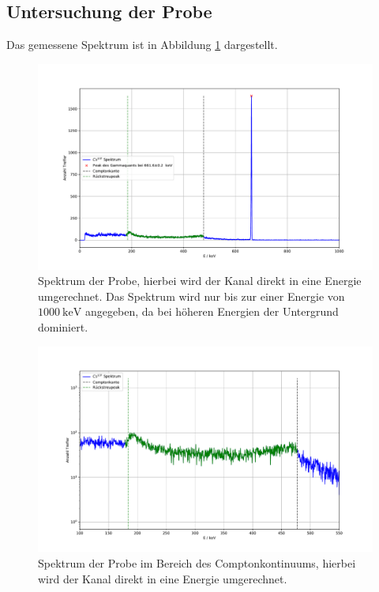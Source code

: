 \subsection{Untersuchung der  Probe}
Das gemessene Spektrum ist in Abbildung \ref{fig:Cs137} dargestellt.
\FloatBarrier
\begin{figure}
  \centering
  \caption{Spektrum der  Probe, hierbei wird der Kanal direkt in eine Energie umgerechnet. Das Spektrum wird nur bis zur einer Energie von $\SI{1000}{\kilo\eV}$ angegeben, da bei höheren Energien der Untergrund dominiert.}
  \label{fig:Cs137}
  \includegraphics[width= \textwidth,keepaspectratio]{figure/02_peaks.pdf}
\end{figure}
\begin{figure}
\centering
\caption{Spektrum der  Probe im Bereich des Comptonkontinuums, hierbei wird der Kanal direkt in eine Energie umgerechnet.}
\label{fig:Cs137_log}
\includegraphics[width= \textwidth,keepaspectratio]{figure/02_peaks_Log.pdf}
\end{figure}

